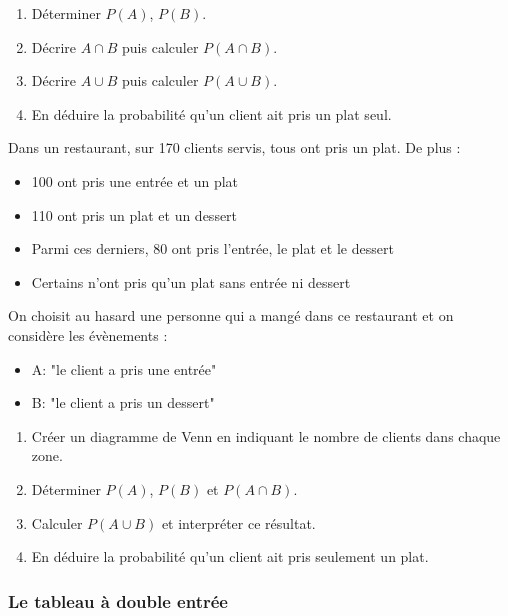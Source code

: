 {\begin{Exercice}
\begin{enumerate}
\item Déterminer $ P(A) $, $  P(B) $.
\item Décrire $A \cap B$ puis calculer $ P(A \cap B) $.
\item Décrire $ A\cup B $ puis calculer $ P(A\cup B) $.
\item En déduire la probabilité qu'un client ait pris un plat seul.
\end{enumerate}
\end{Exercice}

\begin{Exercice}
Dans un restaurant, sur 170 clients servis, tous ont pris un plat. De plus :
\begin{itemize}[label=\textcolor{Couleur6}{$\bullet$}]
\item 100 ont pris une entrée et un plat
\item 110 ont pris un plat et un dessert  
\item Parmi ces derniers, 80 ont pris l'entrée, le plat et le dessert
\item Certains n'ont pris qu'un plat sans entrée ni dessert
\end{itemize}
On choisit au hasard une personne qui a mangé dans ce restaurant et on considère les évènements :
\begin{itemize}[label=\textcolor{Couleur6}{$\bullet$}]
\item A: "le client a pris une entrée"
\item B: "le client a pris un dessert"
\end{itemize} 
\begin{enumerate}
\item Créer un diagramme de Venn en indiquant le nombre de clients dans chaque zone.
\item Déterminer $P(A)$, $P(B)$ et $P(A \cap B)$.
\item Calculer $P(A \cup B)$ et interpréter ce résultat.
\item En déduire la probabilité qu'un client ait pris seulement un plat.
\end{enumerate}
\end{Exercice}

\newpage

\subsubsection*{Le tableau à double entrée}

}
